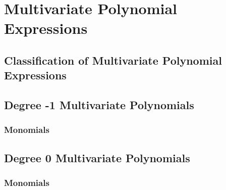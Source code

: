 %
%


\chapter{Multivariate Polynomial Expressions}

\section*{Classification of Multivariate Polynomial Expressions}

\section*{Degree -1 Multivariate Polynomials}

\subsection*{Monomials}

\section*{Degree 0 Multivariate Polynomials}

\subsection*{Monomials}

